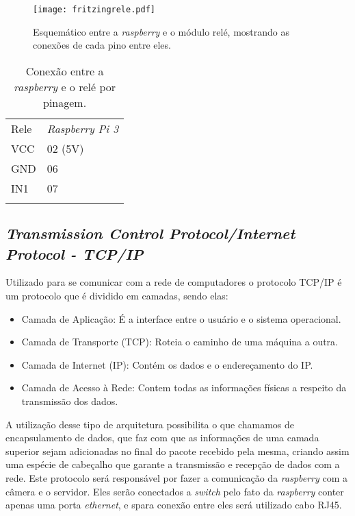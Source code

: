     \begin{figure}[H]
    \centering
    \texttt{[image: fritzingrele.pdf]}
    \caption{Esquemático entre a \emph{raspberry} e o módulo relé, mostrando as conexões de cada pino entre eles.}
    \label{fritizingrele}
\end{figure}

  \begin{table}[h]
 \centering
 {\renewcommand\arraystretch{1.25}
 \caption{Conexão entre a \emph{raspberry} e o relé por pinagem.}
 \begin{tabular}{ l l }
  \cline{1-1}\cline{2-2}  
    \multicolumn{1}{|p{3.850cm}|}{Rele \centering } &
    \multicolumn{1}{p{4.217cm}|}{\emph{Raspberry Pi 3} \centering }
  \\  
  \cline{1-1}\cline{2-2}  
    \multicolumn{1}{|p{3.850cm}|}{VCC \centering } &
    \multicolumn{1}{p{4.217cm}|}{02 (5V) \centering }
  \\  
  \cline{1-1}\cline{2-2}  
    \multicolumn{1}{|p{3.850cm}|}{GND \centering } &
    \multicolumn{1}{p{4.217cm}|}{06  \centering }
  \\  
  \cline{1-1}\cline{2-2}  
    \multicolumn{1}{|p{3.850cm}|}{IN1 \centering } &
    \multicolumn{1}{p{4.217cm}|}{07 \centering }
  \\  
   \hline
\label{tabelarele}
 \end{tabular} }
\end{table}  


\subsection{ \emph{Transmission Control Protocol/Internet Protocol - TCP/IP}}
Utilizado para se comunicar com a rede de computadores o protocolo TCP/IP é um protocolo que é dividido em camadas, sendo elas:
\begin{itemize}
    \item Camada de Aplicação: É a interface entre o usuário e o sistema operacional.
    \item Camada de Transporte (TCP): Roteia o caminho de uma máquina a outra.
    \item Camada de Internet (IP): Contém os dados e o endereçamento do IP.
    \item Camada de Acesso à Rede: Contem todas as informações físicas a respeito da transmissão dos dados.
    
\end{itemize}

A utilização desse tipo de arquitetura possibilita o que chamamos de encapsulamento de dados, que faz com que as informações de uma camada superior sejam adicionadas no final do pacote recebido pela mesma, criando assim uma espécie de cabeçalho que garante a transmissão e recepção de dados com a rede.
Este protocolo será responsável por fazer a comunicação da \emph{raspberry} com a câmera e o servidor. Eles serão conectados a \emph{switch} pelo fato da \emph{raspberry} conter apenas uma porta \emph{ethernet}, e spara conexão entre eles será utilizado cabo RJ45.


